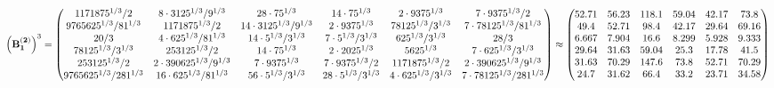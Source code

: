 \documentclass[10pt,a4paper]{article}
\begin{document}
	\[
		\left(\bold{B_1^{(2)}}\right)^{3} = 
		\begin{pmatrix}
			{{1171875^ {1 / 3}}} / {{2}} & {{8} \cdot {3125^ {1 / 3}}} / {{9^ {1 / 3}}} & {{28} \cdot {75^ {1 / 3}}}{} & {{14} \cdot {75^ {1 / 3}}}{} & {{2} \cdot {9375^ {1 / 3}}}{} & {{7} \cdot {9375^ {1 / 3}}} / {{2}} \\
			{{9765625^ {1 / 3}}} / {{81^ {1 / 3}}} & {{1171875^ {1 / 3}}} / {{2}} & {{14} \cdot {3125^ {1 / 3}}} / {{9^ {1 / 3}}} & {{2} \cdot {9375^ {1 / 3}}}{} & {{78125^ {1 / 3}}} / {{3^ {1 / 3}}} & {{7} \cdot {78125^ {1 / 3}}} / {{81^ {1 / 3}}} \\
			{{20}} / {{3}} & {{4} \cdot {625^ {1 / 3}}} / {{81^ {1 / 3}}} & {{14} \cdot {5^ {1 / 3}}} / {{3^ {1 / 3}}} & {{7} \cdot {5^ {1 / 3}}} / {{3^ {1 / 3}}} & {{625^ {1 / 3}}} / {{3^ {1 / 3}}} & {{28}} / {{3}} \\
			{{78125^ {1 / 3}}} / {{3^ {1 / 3}}} & {{253125^ {1 / 3}}} / {{2}} & {{14} \cdot {75^ {1 / 3}}}{} & {{2} \cdot {2025^ {1 / 3}}}{} & {{5625^ {1 / 3}}}{} & {{7} \cdot {625^ {1 / 3}}} / {{3^ {1 / 3}}} \\
			{{253125^ {1 / 3}}} / {{2}} & {{2} \cdot {390625^ {1 / 3}}} / {{9^ {1 / 3}}} & {{7} \cdot {9375^ {1 / 3}}}{} & {{7} \cdot {9375^ {1 / 3}}} / {{2}} & {{1171875^ {1 / 3}}} / {{2}} & {{2} \cdot {390625^ {1 / 3}}} / {{9^ {1 / 3}}} \\
			{{9765625^ {1 / 3}}} / {{2}{81^ {1 / 3}}} & {{16} \cdot {625^ {1 / 3}}} / {{81^ {1 / 3}}} & {{56} \cdot {5^ {1 / 3}}} / {{3^ {1 / 3}}} & {{28} \cdot {5^ {1 / 3}}} / {{3^ {1 / 3}}} & {{4} \cdot {625^ {1 / 3}}} / {{3^ {1 / 3}}} & {{7} \cdot {78125^ {1 / 3}}} / {{2}{81^ {1 / 3}}} \\
		\end{pmatrix}
		\approx
		\begin{pmatrix}
			52.71    & 56.23    & 118.1    & 59.04    & 42.17    & 73.8     \\
			49.4     & 52.71    & 98.4     & 42.17    & 29.64    & 69.16    \\
			6.667    & 7.904    & 16.6     & 8.299    & 5.928    & 9.333    \\
			29.64    & 31.63    & 59.04    & 25.3     & 17.78    & 41.5     \\
			31.63    & 70.29    & 147.6    & 73.8     & 52.71    & 70.29    \\
			24.7     & 31.62    & 66.4     & 33.2     & 23.71    & 34.58    \\
		\end{pmatrix}
	\]
\end{document}
